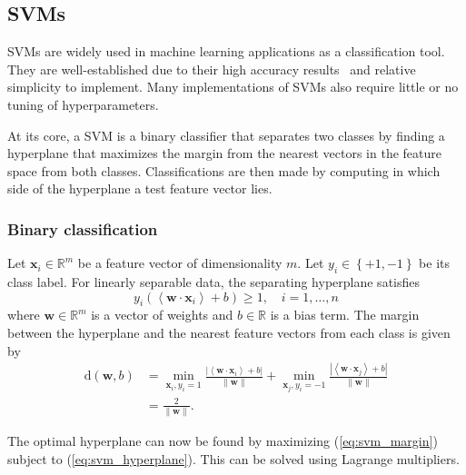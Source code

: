 \subsection{SVMs}

SVMs are widely used in machine learning applications as a classification tool.
They are well-established due to their high accuracy
results~\cite{fagerlund2007bird} and relative simplicity to implement. Many
implementations of SVMs also require little or no tuning of hyperparameters.

At its core, a SVM is a binary classifier that separates two classes by finding
a hyperplane that maximizes the margin from the nearest vectors in the feature
space from both classes. Classifications are then made by computing in which
side of the hyperplane a test feature vector lies.

\subsubsection{Binary classification}

Let $\mathbf{x}_i \in \mathbb{R}^m$ be a feature vector of dimensionality $m$.
Let $y_i \in \left\{ +1, -1 \right\}$ be its class label. For linearly separable
data, the separating hyperplane satisfies
\begin{equation}\label{eq:svm_hyperplane}
y_i\left( \left< \mathbf{w} \cdot \mathbf{x}_i \right> + b \right) \ge 1, \hspace{1em}
i = 1,\ldots,n
\end{equation}
where $\mathbf{w} \in \mathbb{R}^m$ is a vector of weights and $b \in
\mathbb{R}$ is a bias term. The margin between the hyperplane and the nearest
feature vectors from each class is given by
\begin{align}
  \text{d}(\mathbf{w},b) &=
  \min_{\mathbf{x}_i,y_i=1}
  \frac{|\left< \mathbf{w} \cdot \mathbf{x}_i \right> + b|}{\|\mathbf{w}\|} +
  \min_{\mathbf{x}_j,y_i=-1}
  \frac{|\left< \mathbf{w} \cdot \mathbf{x}_j \right> + b|}{\|\mathbf{w}\|} \\[0.5em]
                         &= \frac{2}{\|\mathbf{w}\|}. \label{eq:svm_margin}
\end{align}

The optimal hyperplane can now be found by maximizing (\ref{eq:svm_margin})
subject to (\ref{eq:svm_hyperplane}). This can be solved using Lagrange
multipliers.

